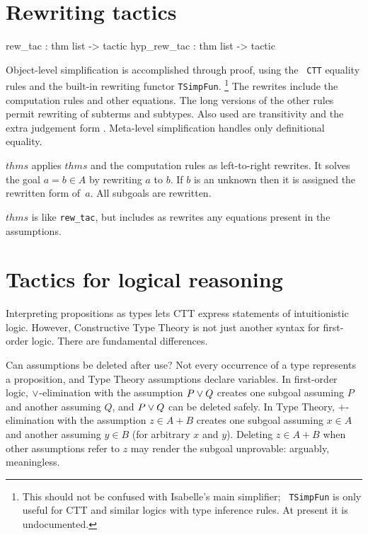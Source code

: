\section{Rewriting tactics}
\begin{ttbox}
rew_tac     : thm list -> tactic
hyp_rew_tac : thm list -> tactic
\end{ttbox}
Object-level simplification is accomplished through proof, using the {\tt
  CTT} equality rules and the built-in rewriting functor
{\tt TSimpFun}.%
\footnote{This should not be confused with Isabelle's main simplifier; {\tt
    TSimpFun} is only useful for CTT and similar logics with type inference
  rules.  At present it is undocumented.}
%
The rewrites include the computation rules and other equations.  The long
versions of the other rules permit rewriting of subterms and subtypes.
Also used are transitivity and the extra judgement form .
Meta-level simplification handles only definitional equality.
\begin{ttdescription}
\item[\ttindexbold{rew_tac} $thms$]
applies $thms$ and the computation rules as left-to-right rewrites.  It
solves the goal $a=b\in A$ by rewriting $a$ to $b$.  If $b$ is an unknown
then it is assigned the rewritten form of~$a$.  All subgoals are rewritten.

\item[\ttindexbold{hyp_rew_tac} $thms$]
is like {\tt rew_tac}, but includes as rewrites any equations present in
the assumptions.
\end{ttdescription}


\section{Tactics for logical reasoning}
Interpreting propositions as types lets CTT express statements of
intuitionistic logic.  However, Constructive Type Theory is not just another
syntax for first-order logic.  There are fundamental differences.

Can assumptions be deleted after use?  Not every occurrence of a type
represents a proposition, and Type Theory assumptions declare variables.
In first-order logic, $\vee$-elimination with the assumption $P\vee Q$
creates one subgoal assuming $P$ and another assuming $Q$, and $P\vee Q$
can be deleted safely.  In Type Theory, $+$-elimination with the assumption
$z\in A+B$ creates one subgoal assuming $x\in A$ and another assuming $y\in
B$ (for arbitrary $x$ and $y$).  Deleting $z\in A+B$ when other assumptions
refer to $z$ may render the subgoal unprovable: arguably,
meaningless.

